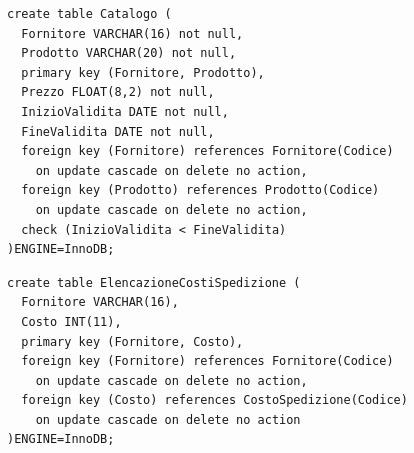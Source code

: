 \begin{verbatim}
create table Catalogo (
  Fornitore VARCHAR(16) not null,
  Prodotto VARCHAR(20) not null,
  primary key (Fornitore, Prodotto),
  Prezzo FLOAT(8,2) not null,
  InizioValidita DATE not null,
  FineValidita DATE not null,
  foreign key (Fornitore) references Fornitore(Codice)
    on update cascade on delete no action,
  foreign key (Prodotto) references Prodotto(Codice)
    on update cascade on delete no action,
  check (InizioValidita < FineValidita)
)ENGINE=InnoDB;
\end{verbatim}
\vspace{0.5cm}

\noindent{}
\newline\newline

\begin{verbatim}
create table ElencazioneCostiSpedizione (
  Fornitore VARCHAR(16),
  Costo INT(11),
  primary key (Fornitore, Costo),
  foreign key (Fornitore) references Fornitore(Codice)
    on update cascade on delete no action,
  foreign key (Costo) references CostoSpedizione(Codice)
    on update cascade on delete no action
)ENGINE=InnoDB;
\end{verbatim}
\vspace{0.5cm}

\noindent{}
\newline\newline

